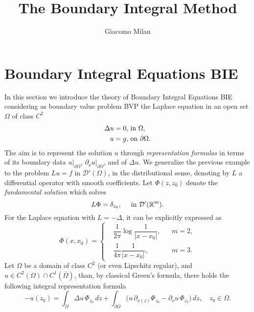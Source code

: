 \documentclass[10pt, a4paper, twoside, openright]{article}
\title{The Boundary Integral Method}
\author{Giacomo Milan}
\numberwithin{equation}{section}
\theoremstyle{definition}
\theoremstyle{plain}
\theoremstyle{plain}
\theoremstyle{plain}
\theoremstyle{plain}
\theoremstyle{plain}
\theoremstyle{plain}
\theoremstyle{plain}
\theoremstyle{plain}
\newcommand{\upin}{\textup{ in }}
\begin{document}
\maketitle
\tableofcontents

\section{Boundary Integral Equations BIE}
In this section we introduce the theory of Boundary Integral Equations BIE considering as boundary 
value problem BVP the Laplace equation in an open set $\Omega$ of class $C^2$
\begin{eqnarray}
 \Delta u = 0, & \textup{ in }\Omega,\label{eq:laplace-in}\\
 u = g, & \textup{ on }\partial\Omega.\label{eq:laplace-on}
\end{eqnarray}
The aim is to represent the solution $u$ through \emph{representation formulas} 
in terms of its boundary data $u|_{\partial \Omega}$, $\partial_\nu u|_{\partial \Omega}$, and 
of $\Delta u$. 
We generalize the previous example to the problem $Lu = f$ in $\mathcal{D}'(\Omega)$, in the 
distributional sense, denoting by $L$ a differential operator with smooth coefficients.
Let $\Phi(z,z_0)$ denote the \emph{fundamental solution} which solves
\begin{equation}
\label{eq:fundamental-solution}
 L\Phi=\delta_{z_0},\quad\upin\mathcal{D}'(\mathbb{R}^m).
\end{equation}
For the Laplace equation with $L=-\Delta$, it can be explicitly expressed as
\begin{equation}
\label{eq:definition-Phi-23}
  \Phi(x,x_0)=
  \left\{
  \begin{aligned}
   &\dfrac{1}{2\pi}\log\dfrac{1}{| x - x_0|}, && m=2, \\
   &\dfrac{1}{4\pi}\dfrac{1}{| x  - x_0|}, && m=3.
  \end{aligned}
  \right.
\end{equation}
Let $\Omega$ be a domain of class $C^2$ (or even Lipschitz regular),
and $u \in C^2(\Omega)\cap C^1(\overline{\Omega})$,
than, by classical Green's formula,
there holds the following integral representation formula
\begin{equation}
  \label{eq:representation-formula}
  - u(z_0) = \int_\Omega\Delta u\,\Phi_{z_0}\,dz 
  + \int_{\partial \Omega}\big(u\, \partial_{\nu(z)} \Phi_{z_0}
  - \partial_\nu u\,\Phi_{z_0}\big)\,dz, \quad z_0 \in \Omega.
\end{equation}
\end{document}
